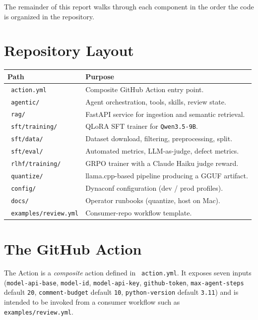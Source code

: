 \documentclass[11pt,a4paper]{article}
\newcommand{\code}[1]{\texttt{\small #1}}
\renewcommand{\path}[1]{\texttt{\small\color{mute} #1}}
\begin{document}
The remainder of this report walks through each component in the order the
code is organized in the repository.

\section{Repository Layout}

\begin{tabular}{@{}p{}p{}@{}}
\toprule
\textbf{Path} & \textbf{Purpose} \\
\midrule
\path{action.yml}           & Composite GitHub Action entry point. \\
\path{agentic/}             & Agent orchestration, tools, skills, review state. \\
\path{rag/}                 & FastAPI service for ingestion and semantic retrieval. \\
\path{sft/training/}        & QLoRA SFT trainer for \code{Qwen3.5-9B}. \\
\path{sft/data/}            & Dataset download, filtering, preprocessing, split. \\
\path{sft/eval/}            & Automated metrics, LLM-as-judge, defect metrics. \\
\path{rlhf/training/}       & GRPO trainer with a Claude Haiku judge reward. \\
\path{quantize/}            & llama.cpp-based pipeline producing a GGUF artifact. \\
\path{config/}              & Dynaconf configuration (dev / prod profiles). \\
\path{docs/}                & Operator runbooks (quantize, host on Mac). \\
\path{examples/review.yml}  & Consumer-repo workflow template. \\
\bottomrule
\end{tabular}

\section{The GitHub Action}
\label{sec:action}

The Action is a \emph{composite} action defined in \path{action.yml}. It
exposes seven inputs (\code{model-api-base}, \code{model-id},
\code{model-api-key}, \code{github-token}, \code{max-agent-steps} default
\code{20}, \code{comment-budget} default \code{10}, \code{python-version}
default \code{3.11}) and is intended to be invoked from a consumer workflow
such as \path{examples/review.yml}.
\end{document}
